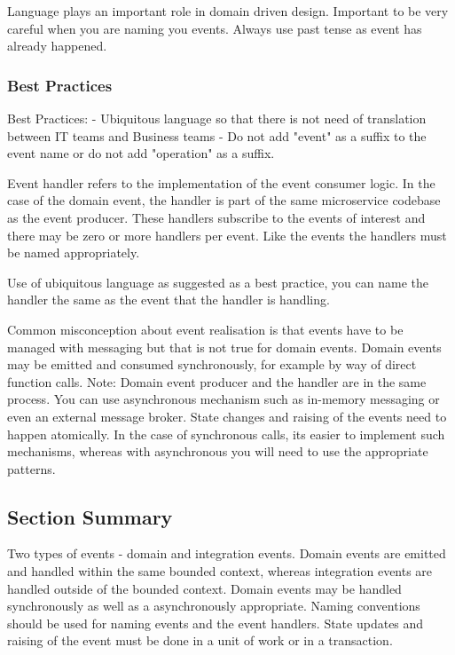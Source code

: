 \documentclass[a4paper, 11pt]{book}
\begin{document}
    Language plays an important role in domain driven design.
    Important to be very careful when you are naming you events.
    Always use past tense as event has already happened.

    \subsubsection{Best Practices}
    Best Practices:
    - Ubiquitous language so that there is not need of translation between IT teams and Business teams
    - Do not add "event" as a suffix to the event name or do not add "operation" as a suffix.

    Event handler refers to the implementation of the event consumer logic.
    In the case of the domain event, the handler is part of the same microservice codebase as the event producer.
    These handlers subscribe to the events of interest and there may be zero or more handlers per event.
    Like the events the handlers must be named appropriately.

    Use of ubiquitous language as suggested as a best practice, you can name the handler the same as the event that the handler is handling.

    Common misconception about event realisation is that events have to be managed with messaging but that is not true for domain events.
    Domain events may be emitted and consumed synchronously, for example by way of direct function calls.
    Note: Domain event producer and the handler are in the same process.
    You can use asynchronous mechanism such as in-memory messaging or even an external message broker.
    State changes and raising of the events need to happen atomically.
    In the case of synchronous calls, its easier to implement such mechanisms, whereas with asynchronous you will need to use the appropriate patterns.

    \subsection{Section Summary}
    Two types of events - domain and integration events.
    Domain events are emitted and handled within the same bounded context, whereas integration events are handled outside of the bounded context.
    Domain events may be handled synchronously as well as a asynchronously appropriate.
    Naming conventions should be used for naming events and the event handlers.
    State updates and raising of the event must be done in a unit of work or in a transaction.
\end{document}
